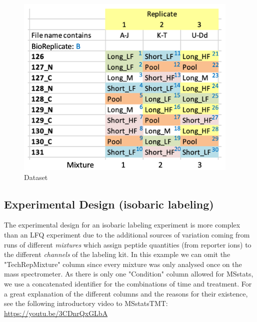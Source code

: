 \begin{figure}[htbp]
  \centering
  \includegraphics[width=0.95\textwidth]{graphics/isobaric/Dataset_MSstatsTMT.png}
  \caption{Dataset}
  \label{fig:isobaric_dataset_plubell}
\end{figure}

\subsection{Experimental Design (isobaric labeling)}
The experimental design for an isobaric labeling experiment is more complex than an LFQ experiment due to
the additional sources of variation coming from runs of different \textit{mixtures} which assign
peptide quantities (from reporter ions) to the different \textit{channels} of the labeling kit.
In this example we can omit the "TechRepMixture" column since every mixture was only analysed once on
the mass spectrometer. As there is only one "Condition" column allowed for MSstats, we use a concatenated
identifier for the combinations of time and treatment.
For a great explanation of the different columns and the reasons for their existence,
see the following introductory video to MSstatsTMT:
\url{https://youtu.be/3CDnrQxGLbA}

